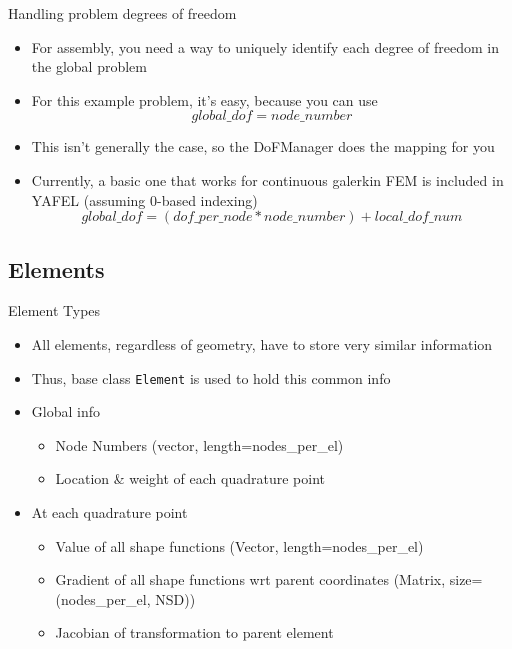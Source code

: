 \begin{frame}{Handling problem degrees of freedom}
  \begin{itemize}
  \item
    For assembly, you need a way to uniquely identify each
    degree of freedom in the global problem
  \item
    For this example problem, it's easy, because you can use
    \[
    global\_dof = node\_number
    \]
  \item
    This isn't generally the case, so the DoFManager does the mapping for you
  \item
    Currently, a basic one that works for continuous galerkin FEM
    is included in YAFEL (assuming 0-based indexing)
    \[
    global\_dof = (dof\_per\_node*node\_number) + local\_dof\_num
    \]
  \end{itemize}
\end{frame}

\subsection{Elements}
\begin{frame}{Element Types}
  \begin{itemize}
  \item
    All elements, regardless of geometry, have to store very similar information
  \item
    Thus, base class \texttt{Element} is used to hold this common info
  \item
    Global info
    \begin{itemize}
    \item
      Node Numbers (vector, length=nodes\_per\_el)
    \item
      Location \& weight of each quadrature point
    \end{itemize}
  \item
    At each quadrature point
    \begin{itemize}
    \item
      Value of all shape functions (Vector, length=nodes\_per\_el)
    \item
      Gradient of all shape functions wrt parent coordinates 
      (Matrix, size=(nodes\_per\_el, NSD))
    \item
      Jacobian of transformation to parent element
    \end{itemize}
  \end{itemize}
\end{frame}

